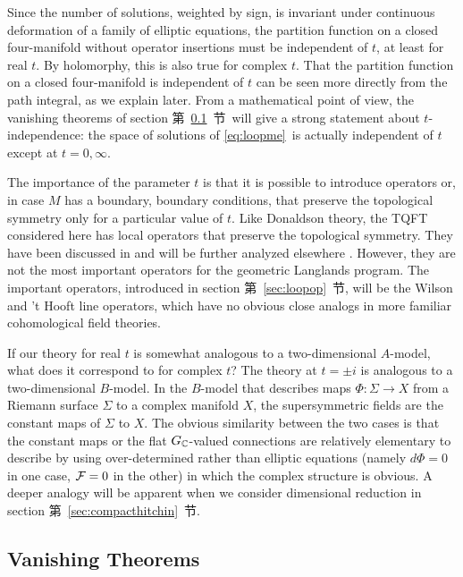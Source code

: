 Since the number of solutions, weighted by sign, is invariant
under continuous deformation of a family of elliptic equations,
the partition function on a closed four-manifold without operator
insertions must be independent of $t$, at least for real $t$. By
holomorphy, this is also true for complex $t$.  That the partition
function on a closed four-manifold is independent of $t$ can be
seen more directly from the path integral, as we explain later.
{}From a mathematical point of view, the vanishing theorems of
section 第~\ref{sec:vanishing}~节\ will give a strong statement about
$t$-independence: the space of solutions of \eqref{eq:loopme}\ is actually
independent of $t$ except at $t=0,\infty$.

The importance of the parameter $t$ is that it is possible to
introduce operators or, in case $M$ has a boundary, boundary
conditions, that preserve the topological symmetry only for a
particular value of $t$. Like Donaldson theory, the TQFT
considered here has local operators that preserve the topological
symmetry. They have been discussed in \cite{ref53,ref54,ref55,ref56,ref57} and
will be further analyzed elsewhere \cite{ref26}.  However, they are not
the most important operators for the  geometric Langlands program.
The important operators, introduced in section 第~\ref{sec:loopop}~节, will be
the Wilson and 't Hooft line operators, which have no obvious
close analogs in more familiar cohomological field theories.

If our theory for real $t$ is somewhat analogous to a
two-dimensional $A$-model, what does it correspond to for complex
$t$?  The theory at $t=\pm i$ is analogous to a two-dimensional
$B$-model.
 In the $B$-model that describes  maps $\Phi:\Sigma\to X$ from a
Riemann surface $\Sigma$ to a complex manifold $X$,  the
supersymmetric fields are the constant maps of $\Sigma$ to $X$.
The obvious similarity between the two cases is that the constant
maps or the flat $G_{\Bbb{C}}$-valued connections are relatively
elementary to describe  by using over-determined rather than
elliptic equations (namely $d\Phi=0$ in one case, ${\cal F}=0$ in
the other) in which the complex structure is obvious. A deeper
analogy will be apparent when we consider dimensional reduction in
section 第~\ref{sec:compacthitchin}~节.

\subsection{Vanishing Theorems}

\label{sec:vanishing}

